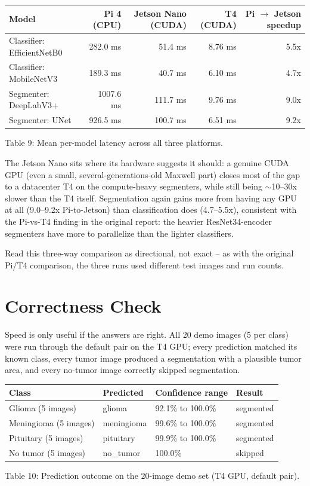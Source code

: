 \documentclass[11pt]{article}
\begin{document}
\begin{center}
\begin{tabular}{lrrrr}
\toprule
Model & Pi 4 (CPU) & Jetson Nano (CUDA) & T4 (CUDA) & Pi $\to$ Jetson speedup \\
\midrule
Classifier: EfficientNetB0 & 282.0 ms & 51.4 ms & 8.76 ms & 5.5x \\
Classifier: MobileNetV3 & 189.3 ms & 40.7 ms & 6.10 ms & 4.7x \\
Segmenter: DeepLabV3+ & 1007.6 ms & 111.7 ms & 9.76 ms & 9.0x \\
Segmenter: UNet & 926.5 ms & 100.7 ms & 6.51 ms & 9.2x \\
\bottomrule
\end{tabular}
\end{center}
\begin{center}\small Table 9: Mean per-model latency across all three platforms.\end{center}

The Jetson Nano sits where its hardware suggests it should: a genuine CUDA GPU (even a
small, several-generations-old Maxwell part) closes most of the gap to a datacenter T4 on
the compute-heavy segmenters, while still being $\sim$10--30x slower than the T4 itself.
Segmentation again gains more from having any GPU at all (9.0--9.2x Pi-to-Jetson) than
classification does (4.7--5.5x), consistent with the Pi-vs-T4 finding in the original
report: the heavier ResNet34-encoder segmenters have more to parallelize than the
lighter classifiers.

Read this three-way comparison as directional, not exact -- as with the original Pi/T4
comparison, the three runs used different test images and run counts.

\section{Correctness Check}

Speed is only useful if the answers are right. All 20 demo images (5 per class) were run
through the default pair on the T4 GPU; every prediction matched its known class, every
tumor image produced a segmentation with a plausible tumor area, and every no-tumor image
correctly skipped segmentation.

\begin{center}
\begin{tabular}{llll}
\toprule
Class & Predicted & Confidence range & Result \\
\midrule
Glioma (5 images) & glioma & 92.1\% to 100.0\% & segmented \\
Meningioma (5 images) & meningioma & 99.6\% to 100.0\% & segmented \\
Pituitary (5 images) & pituitary & 99.9\% to 100.0\% & segmented \\
No tumor (5 images) & no\_tumor & 100.0\% & skipped \\
\bottomrule
\end{tabular}
\end{center}
\begin{center}\small Table 10: Prediction outcome on the 20-image demo set (T4 GPU, default pair).\end{center}
\end{document}
